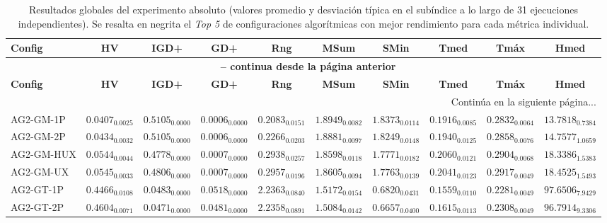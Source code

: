 \begingroup
\tiny
\setlength{\tabcolsep}{0.5pt}
\begin{longtable}{@{}lccccccccc@{}}
\caption[Resultados de las métricas de evaluación (Absoluto)]{Resultados globales del experimento absoluto (valores promedio y desviación típica en el subíndice a lo largo de 31 ejecuciones independientes). Se resalta en negrita el \textit{Top 5} de configuraciones algorítmicas con mejor rendimiento para cada métrica individual.}
\label{tab:resultados_metricas} \\
\toprule
\textbf{Config} & \textbf{HV} & \textbf{IGD+} & \textbf{GD+} & \textbf{Rng} & \textbf{MSum} & \textbf{SMin} & \textbf{Tmed} & \textbf{Tmáx} & \textbf{Hmed} \\
\midrule
\endfirsthead
\multicolumn{10}{c}{{\bfseries \tablename\ \thetable{} -- continua desde la página anterior}} \\
\toprule
\textbf{Config} & \textbf{HV} & \textbf{IGD+} & \textbf{GD+} & \textbf{Rng} & \textbf{MSum} & \textbf{SMin} & \textbf{Tmed} & \textbf{Tmáx} & \textbf{Hmed} \\
\midrule
\endhead
\midrule \multicolumn{10}{r}{{Continúa en la siguiente página...}} \\
\endfoot
\bottomrule
\endlastfoot
AG2-GM-1P & $0.0407_{0.0025}$ & $0.5105_{0.0000}$ & $0.0006_{0.0000}$ & $0.2083_{0.0151}$ & $1.8949_{0.0082}$ & $1.8373_{0.0114}$ & $0.1916_{0.0085}$ & $0.2832_{0.0064}$ & $13.7818_{0.7384}$ \\
AG2-GM-2P & $0.0434_{0.0032}$ & $0.5105_{0.0000}$ & $0.0006_{0.0000}$ & $0.2266_{0.0203}$ & $1.8881_{0.0097}$ & $1.8249_{0.0148}$ & $0.1940_{0.0125}$ & $\mathbf{0.2858}_{0.0076}$ & $14.7577_{1.0659}$ \\
AG2-GM-HUX & $0.0544_{0.0044}$ & $0.4778_{0.0000}$ & $0.0007_{0.0000}$ & $0.2938_{0.0257}$ & $1.8598_{0.0118}$ & $1.7771_{0.0182}$ & $0.2060_{0.0121}$ & $\mathbf{0.2904}_{0.0068}$ & $18.3386_{1.5383}$ \\
AG2-GM-UX & $0.0545_{0.0033}$ & $0.4806_{0.0000}$ & $0.0007_{0.0000}$ & $0.2957_{0.0196}$ & $1.8605_{0.0094}$ & $1.7763_{0.0139}$ & $0.2041_{0.0123}$ & $\mathbf{0.2917}_{0.0049}$ & $18.4525_{1.5493}$ \\
AG2-GT-1P & $0.4466_{0.0108}$ & $0.0483_{0.0000}$ & $0.0518_{0.0000}$ & $\mathbf{2.2363}_{0.0840}$ & $1.5172_{0.0154}$ & $0.6820_{0.0431}$ & $0.1559_{0.0110}$ & $0.2281_{0.0049}$ & $97.6506_{7.9429}$ \\
AG2-GT-2P & $0.4604_{0.0071}$ & $0.0471_{0.0000}$ & $0.0481_{0.0000}$ & $2.2358_{0.0891}$ & $1.5084_{0.0142}$ & $0.6657_{0.0400}$ & $0.1615_{0.0113}$ & $0.2308_{0.0049}$ & $96.7914_{9.3306}$ \\

\end{longtable}
